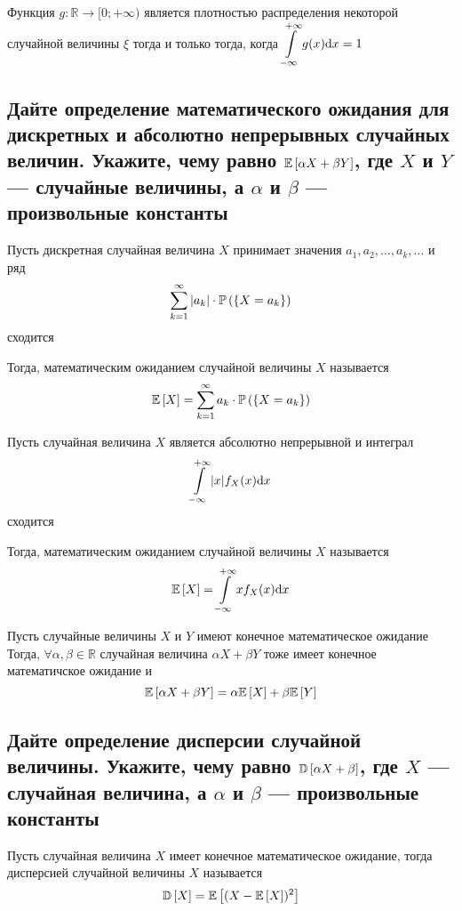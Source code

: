 \documentclass{article}
\begin{document}
\theorem Функция $g:\mathbb{R}\to[0;+\infty)$ является плотностью распределения некоторой случайной величины $\xi$ тогда и только тогда, когда $\displaystyle\int\limits_{-\infty}^{+\infty} g(x)\text{d}x=1$

\subsection{Дайте определение математического ожидания для дискретных и абсолютно непрерывных случайных величин. Укажите, чему равно $\mathbb{E}\left[\alpha X+\beta Y\right]$, где $X$ и $Y$ — случайные величины, а $\alpha$ и $\beta$ — произвольные константы}
 Пусть дискретная случайная величина $X$ принимает значения $a_1,a_2,\ldots,a_k,\ldots$ и ряд 
\begin{equation*}
    \sum_{k=1}^{\infty}|a_k|\cdot\prob{X=a_k}
\end{equation*}
сходится

Тогда, математическим ожиданием случайной величины $X$ называется
\begin{equation*}
    \matwait{X}=\sum_{k=1}^{\infty}a_k\cdot\prob{X=a_k}
\end{equation*}

 Пусть случайная величина $X$ является абсолютно непрерывной и интеграл
\begin{equation*}
    \int\limits_{-\infty}^{+\infty}|x|f_{X}(x)\text{d}x
\end{equation*}
сходится

Тогда, математическим ожиданием случайной величины $X$ называется 
\begin{equation*}
    \mathbb{E}\left[X\right]=\int\limits_{-\infty}^{+\infty}xf_X(x)\text{d}x
\end{equation*}

\theorem Пусть случайные величины $X$ и $Y$ имеют конечное математическое ожидание\\
Тогда, $\forall \alpha,\beta\in\mathbb{R}$ случайная величина $\alpha X+\beta Y$ тоже имеет конечное математичское ожидание и 
\begin{equation*}
    \mathbb{E}\left[\alpha X+\beta Y\right]=\alpha\mathbb{E}\left[X\right]+\beta\mathbb{E}\left[Y\right]
\end{equation*}

\subsection{Дайте определение дисперсии случайной величины. Укажите, чему равно $\mathbb{D}\left[\alpha X+\beta\right]$, где $X$ — случайная величина, а $\alpha$ и $\beta$ — произвольные константы}
 Пусть случайная величина $X$ имеет конечное математическое ожидание, тогда дисперсией случайной величины $X$ называется 
\begin{equation*}
    \mathbb{D}\left[X\right]=\mathbb{E}\left[(X-\mathbb{E}\left[X\right])^2\right]
\end{equation*}
\end{document}
